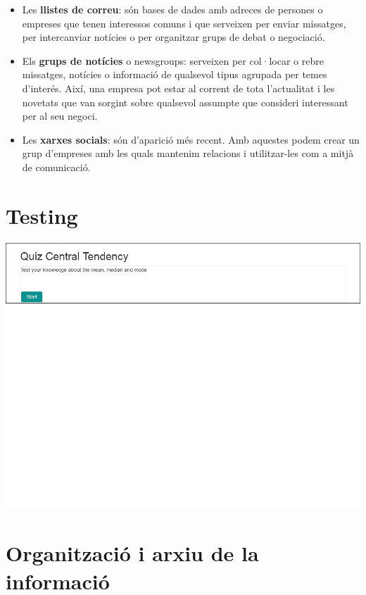 \documentclass[
]{book}
\begin{document}
\begin{itemize}
\item
  Les \textbf{llistes de correu}: són bases de dades amb adreces de persones o empreses que tenen interessos comuns i que serveixen per enviar missatges, per intercanviar notícies o per organitzar grups de debat o negociació.
\item
  Els \textbf{grups de notícies} o newsgroups: serveixen per col·locar o rebre missatges, notícies o informació de qualsevol tipus agrupada per temes d'interés. Així, una empresa pot estar al corrent de tota l'actualitat i les novetats que van sorgint sobre qualsevol assumpte que consideri interessant per al seu negoci.
\item
  Les \textbf{xarxes socials}: són d'aparició més recent. Amb aquestes podem crear un grup d'empreses amb les quals mantenim relacions i utilitzar-les com a mitjà de comunicació.
\end{itemize}

\hypertarget{testing}{%
\chapter{Testing}\label{testing}}

\includegraphics{qui1.png}

\hypertarget{organitzaciuxf3-i-arxiu-de-la-informaciuxf3}{%
\chapter{Organització i arxiu de la informació}\label{organitzaciuxf3-i-arxiu-de-la-informaciuxf3}}
\end{document}
